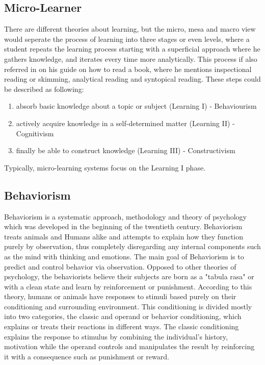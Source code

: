 \subsection{Micro-Learner}

There are different theories about learning, but the micro, mesa and macro view 
would seperate the process of learning into three stages or even levels, where a 
student repeats the learning process starting with a superficial approach where 
he gathers knowledge, and iterates every time more analytically. This process 
if also referred in \cite{adler_1970} on his guide on how to read a book, where he
mentions inspectional reading or skimming, analytical reading and syntopical reading.
These steps could be described as following:

\begin{enumerate}
    \item absorb basic knowledge about a topic or subject (Learning I) - Behaviourism
    \item actively acquire knowledge in a self-determined matter (Learning II) 
    - 
    Cognitivism
    \item finally be able to construct knowledge (Learning III) - Constructivism
\end{enumerate}

Typically, micro-learning systems focus on the Learning I phase. 

\subsection{Behaviorism}

Behaviorism is a systematic approach, methodology and theory of psychology which
was developed in the beginning of the twentieth century. Behaviorism treats 
animals and Humans alike and attempts to explain how they function 
purely by observation, thus completely disregarding any internal components such 
as the mind with thinking and emotions. The main goal of Behaviorism is to predict
and control behavior via observation. Opposed to other theories of psychology, the
behaviorists believe their subjects are born as a "tabula rasa" or with a 
clean state and learn by reinforcement or punishment. According to this theory,
humans or animals have responses to stimuli based purely on their conditioning
and surrounding environment. This conditioning is divided mostly into two 
categories, the classic and operand or behavior conditioning, which explains or 
treats their reactions in different ways. The classic conditioning explains the 
response to stimulus by combining the individual's history, motivation while 
the operand controls and manipulates the result by reinforcing it with a 
consequence such as punishment or reward.

